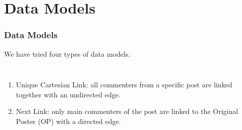 \documentclass[aspectratio=169]{beamer}
\begin{document}
\section{Data Models}
\newcommand{\asuivre}{\setcounter{sauvegardeenumi}{\theenumi}}
\newcommand{\suite}{\setcounter{enumi}{\thesauvegardeenumi}}
\begin{frame}[t]
    \frametitle{Data Models}
    We have tried four types of data models.
    \begin{columns}
        \begin{enumerate}
            \item Unique Cartesian Link: all commenters from a specific post are linked together with an undirected edge.
            \item Next Link: only main commenters of the post are linked to the Original Poster (OP) with a directed edge.
                \asuivre
        \end{enumerate}
    \end{columns}
\end{frame}
\end{document}
